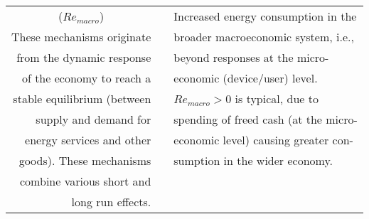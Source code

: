 \begin{table}
\begin{center}
\begin{tabular}{ r l l }
\multicolumn{1}{c}{($Re_{macro}$)} &                                              & Increased energy consumption in the  \\
These mechanisms originate         &                                              & broader macroeconomic system, i.e.,  \\
from the dynamic response          &                                              & beyond responses at the micro-  \\
of the economy to reach a          &                                              & economic (device/user) level. \\
stable equilibrium (between        &                                              & $Re_{macro} > 0$ is typical, due to   \\
supply and demand for              &                                              & spending of freed cash (at the micro-\\
energy services and other          &                                              & economic level) causing greater con- \\
goods). These mechanisms           &                                              & sumption in the wider economy. \\
combine various short and          &                                              &  \\
long run effects.                  &                                              &  \\
\bottomrule
\end{tabular}
\end{center}
\end{table}